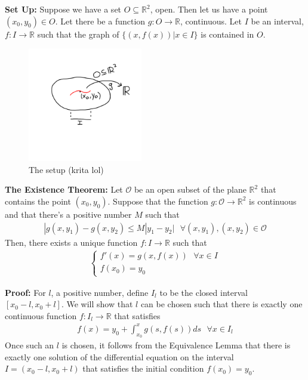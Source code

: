 \documentclass{article}
\newcommand*{\txt}[1]{\text{ #1 }}%
\newcommand*{\fora}{\txt{}\forall}%
\newcommand*{\rr}{\mathbb{R}}%
\begin{document}
\textbf{Set Up:} Suppose we have a set $O\subseteq \rr^2$, open. Then let us have a point $(x_0,y_0)\in O$. Let there be a function $g:O\to \rr$, continuous. Let $I$ be an interval, $f:I\to \rr$ such that the graph of $\{(x,f(x))|x\in I\}$ is contained in $O$.

\begin{figure}[H]
    \centering
    \includegraphics[height=5cm, trim=0 30px 0 30px, clip]{fig1.png}
    \caption{The setup (krita lol)}
    \label{fig:fig1}
\end{figure}

\textbf{The Existence Theorem:} Let $\mathcal{O}$ be an open subset of the plane $\rr^2$ that contains the point $(x_0,y_0)$. Suppose that the function $g:\mathcal{O}\to\rr^2$ is continuous and that there's a positive number $M$ such that \begin{align*}
    |g(x,y_1)-g(x,y_2)\leq M|y_1-y_2|\fora (x,y_1),(x,y_2)\in\mathcal{O}
\end{align*} Then, there exists a unique function $f:I\to\rr$ such that \begin{align*}
    \begin{cases}
        f'(x)=g(x,f(x))\fora x\in I \\
        f(x_0)=y_0
    \end{cases}
\end{align*}

\textbf{Proof:} For $\mathit{l}$, a positive number, define $I_\mathit{l}$ to be the closed interval $[x_0-\mathit{l},x_0+\mathit{l}]$. We will show that $\mathit{l}$ can be chosen such that there is exactly one continuous function $f:I_\mathit{l}\to\rr$ that satisfies \begin{align*}
    f(x)=y_0+\int_{x_0}^{x}g(s,f(s))ds\fora x\in I_\mathit{l}
\end{align*} Once such an $\mathit{l}$ is chosen, it follows from the Equivalence Lemma that there is exactly one solution of the differential equation on the interval $I=(x_0-\mathit{l},x_0+\mathit{l})$ that satisfies the initial condition $f(x_0)=y_0$.
\end{document}

